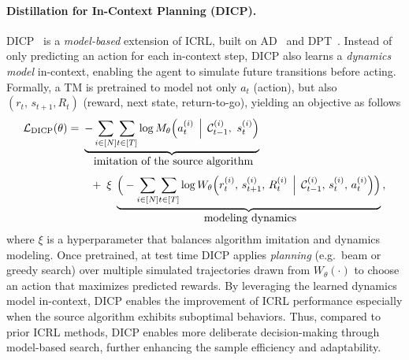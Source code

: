 \documentclass{article}
\newcommand{\gL}{\mathcal{L}}
\def\ccalC{{\ensuremath{\mathcal C}}}
\begin{document}
\paragraph{Distillation for In-Context Planning (DICP).}
DICP~\citep{son2025distilling} is a \emph{model-based} extension of ICRL, built on AD~\citep{laskin2022context} and DPT~\citep{lee2024supervised}.
Instead of only predicting an action for each in-context step, DICP also learns a \emph{dynamics model} in-context, enabling the agent to simulate future transitions before acting.
Formally, a TM is pretrained to model not only $a_t$ (action), but also $(r_t,\,s_{t+1}, R_t)$ (reward, next state, return-to-go), yielding an objective as follows
\begin{equation}
\label{eq:dicp}
\begin{aligned}
\gL_{\mathrm{DICP}}(\theta)
= &~
\underbrace{
- \sum_{i \in [N]}\!
  \sum_{t \in [T]}
  \log
  M_{\theta}\Bigl(
    a_{t}^{(i)}
    \,\Bigm|\,
    \ccalC_{t-1}^{(i)},\
    s_{t}^{(i)}
  \Bigr)
}_{\text{\normalsize imitation of the source algorithm}}
\\[0.3em]
& \quad
+ \;
\xi \;
\underbrace{
  \Big(- \sum_{i \in [N]}\!
  \sum_{t \in [T]}
  \log
  W_{\theta}\Bigl(
    r_{t}^{(i)},\,s_{t+1}^{(i)},\, R_t^{(i)}
    \,\Bigm|\,\ccalC_{t-1}^{(i)},\,s_{t}^{(i)}, \,
    a_{t}^{(i)}
  \Bigr)\Big)
}_{\text{\normalsize modeling dynamics}}
\,,
\end{aligned}
\end{equation}
where \(\xi\) is a hyperparameter that balances algorithm imitation and dynamics modeling.
Once pretrained, at test time DICP applies \emph{planning} (e.g.\ beam or greedy search) over multiple simulated trajectories drawn from $W_{\theta}(\cdot)$ to choose an action that maximizes predicted rewards. By leveraging the learned dynamics model in-context, DICP enables the improvement of ICRL performance especially when the source algorithm exhibits suboptimal behaviors. Thus, compared to prior ICRL methods, DICP enables more deliberate decision-making through model-based search, further enhancing the sample efficiency and adaptability.
\end{document}
